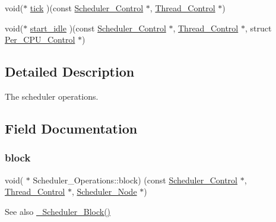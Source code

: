 \begin{DoxyCompactItemize}
\item 
void($\ast$ \mbox{\hyperlink{structScheduler__Operations_acbdbe5ca6a61309b15e57f0b3924ecb0}{tick}} )(const \mbox{\hyperlink{struct__Scheduler__Control}{Scheduler\+\_\+\+Control}} $\ast$, \mbox{\hyperlink{struct__Thread__Control}{Thread\+\_\+\+Control}} $\ast$)
\item 
void($\ast$ \mbox{\hyperlink{structScheduler__Operations_a1393904c5c9b8b964ed1c8d225467d22}{start\+\_\+idle}} )(const \mbox{\hyperlink{struct__Scheduler__Control}{Scheduler\+\_\+\+Control}} $\ast$, \mbox{\hyperlink{struct__Thread__Control}{Thread\+\_\+\+Control}} $\ast$, struct \mbox{\hyperlink{structPer__CPU__Control}{Per\+\_\+\+C\+P\+U\+\_\+\+Control}} $\ast$)
\end{DoxyCompactItemize}


\subsection{Detailed Description}
The scheduler operations. 

\subsection{Field Documentation}
\mbox{\label{structScheduler__Operations_ae34999aba57729811328c817f0ae7e43}} 
\subsubsection{\texorpdfstring{block}{block}}
{\footnotesize\ttfamily void( $\ast$ Scheduler\+\_\+\+Operations\+::block) (const \mbox{\hyperlink{struct__Scheduler__Control}{Scheduler\+\_\+\+Control}} $\ast$, \mbox{\hyperlink{struct__Thread__Control}{Thread\+\_\+\+Control}} $\ast$, \mbox{\hyperlink{structScheduler__Node}{Scheduler\+\_\+\+Node}} $\ast$)}

\begin{DoxySeeAlso}{See also}
\mbox{\hyperlink{group__RTEMSScoreScheduler_gad25705e24ba30f0cb36c0e2999fbfbce}{\+\_\+\+Scheduler\+\_\+\+Block()}} 
\end{DoxySeeAlso}
\mbox{\label{structScheduler__Operations_a10f2951309665f4c7bc5270d35224437}} 

